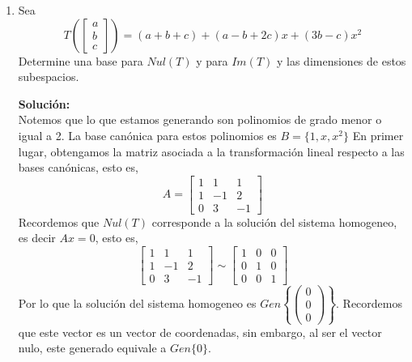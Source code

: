 \documentclass[12pt]{article}
\newenvironment{solucion}
{\begin{mdframed}[backgroundcolor=black!10]
		{\bf Solución:}\\
	}
	{
	\end{mdframed}
}
\newenvironment{preguntas}
{\begin{enumerate}\itemsep12pt
	}
	{
	\end{enumerate}
}
\begin{document}
\begin{preguntas}
\begin{solucion}
\begin{enumerate}[a)]
			$$p_1(t) = (1,0,0)$$
			$$f(t) = (8,-15,10)$$
			$$g(t) = (4,-7,4)$$
			Armamos una matriz con ellos y pivoteamos,
			$$\begin{bmatrix}
			1 & 0 & 0 \\
			8 & -15 & 10 \\
			4 & -7 & 4
			\end{bmatrix}
			\sim
			\begin{bmatrix}
			1 & 0 & 0 \\
			0 & 1 & 0 \\
			0 & 0 & 1
			\end{bmatrix}$$
			Por lo que sus el conjunto $\{p_1(t), f(t), g(t)\}$ es $L.I.$
\end{enumerate}
\end{solucion}
\item Sea
$$T\left(\left[ \begin{array}{c}
a\\ b\\ c \end{array} \right] \right) = (a+b+c) + (a-b+2c)x +
(3b-c)x^2
$$
Determine una base para $Nul(T) $ y para $Im (T) $ y las dimensiones de estos subespacios.
\begin{solucion}
Notemos que lo que estamos generando son polinomios de grado menor o igual a 2. La base canónica para estos polinomios es $B=\{1, x, x^2\}$
En primer lugar, obtengamos la matriz asociada a la transformación lineal respecto a las bases canónicas, esto es,
$$A = \begin{bmatrix}
1 & 1 & 1 \\
1 & -1 & 2 \\
0 & 3 & -1
\end{bmatrix}$$
Recordemos que $Nul(T)$ corresponde a la solución del sistema homogeneo, es decir $Ax = 0$, esto es,
$$\begin{bmatrix}
1 & 1 & 1 \\
1 & -1 & 2 \\
0 & 3 & -1
\end{bmatrix} \sim 
\begin{bmatrix}
1 & 0 & 0 \\
0 & 1 & 0 \\
0 & 0 & 1
\end{bmatrix}$$
Por lo que la solución del sistema homogeneo es $Gen\left\{\begin{pmatrix}0 \\ 0 \\ 0 \end{pmatrix}\right\}$. Recordemos que este vector es un vector de coordenadas, sin embargo, al ser el vector nulo, este generado equivale a $Gen\{0\}$.\\


\end{solucion}
\end{preguntas}
\end{document}
